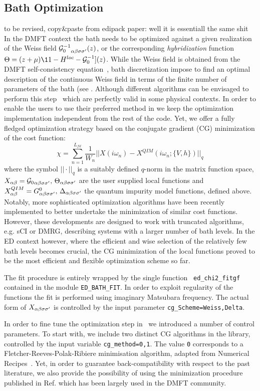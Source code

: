 \documentclass[edipack2.tex]{subfiles}
\begin{document}
\subsection{Bath Optimization}\label{sSecFit}
{\color{red} to be revised, copy\&paste from edipack paper: well it is
  essentiall the same shit} 
In the DMFT context the bath needs to be optimized
against a given realization of the Weiss field
${{\cal G}^{-1}_{0}}_{\alpha\beta\sigma\sigma'}(z)$, or the corresponding {\it hybridization} function
$\Theta = (z + \mu)\11 - H^{loc} -\GG_0^{-1}](z)$. While the Weiss
field is obtained from the DMFT self-consistency
equation~\cite{Georges1996RMP}, bath discretization impose to  find an optimal
description of the continuous Weiss field in terms of the finite
number of parameters of the bath (see .
Although different algorithms can be envisaged to perform this
step~\cite{Garcia2004PRL,Taranto2012PRB} which are perfectly valid in
some physical contexts.
In order to enable the users to use their preferred 
method in \NAME we keep the optimization implementation independent
from the rest of the code. Yet, we offer a fully fledged optimization
strategy based on the  conjugate gradient (CG) minimization of the cost function:
$$
\chi = \sum_{n=1}^{L_{fit}}\frac{1}{W_n}||X(i\omega_n) - X^{QIM}(i\omega_n;\{V,h\})||_q
$$
where the symbol $|| \cdot ||_q$ is a suitably defined $q$-norm in the
matrix function space, $X_{\alpha\beta}={{\cal G}_{0}}_{\alpha\beta\sigma\sigma'},\,\Theta_{\alpha\beta\sigma\sigma'}$ are the user
supplied local functions and
$X_{\alpha\beta}^{QIM}=G^0_{\alpha\beta\sigma\sigma'},\,\Delta_{\alpha\beta\sigma\sigma'}$ the
quantum impurity model functions, defined above.
Notably, more sophisticated optimization algorithms have been
recently implemented to better undertake the minimization of similar
cost functions. However, these developments are designed to work with truncated
algorithms, e.g. sCI or DMRG, describing systems with a larger number of
bath levels.   
In the ED context however, where the efficient and wise selection of
the relatively few bath levels becomes crucial, the CG minimization of
the local functions proved to be the most efficient and
flexible optimization scheme so far. 

The fit procedure is entirely wrapped by the single function {\tt
  ed\_chi2\_fitgf} contained in the module \texttt{ED\_BATH\_FIT}.   
In order to exploit regularity of the functions the fit is 
performed using imaginary Matsubara frequency. 
The actual form of $X_{\alpha\beta\sigma\sigma'}$ is controlled by the input parameter
\texttt{cg\_Scheme=Weiss,Delta}. 

In order to fine tune the optimization step in \NAME\ we
introduced a number of control parameters. To start with, we include
two distinct CG algorithms in the library, controlled by the input variable
\texttt{cg\_method=0,1}. The value \texttt{0} corresponds to a
Fletcher-Reeves-Polak-Ribiere minimisation algorithm, adapted from
Numerical Recipes~\cite{NumRec77}. Yet, in order to guarantee
back-compatibility with respect to the past literature, we also provide the
possibility of using the minimization procedure published in
Ref. which has been largely used in the DMFT
community.
\end{document}
